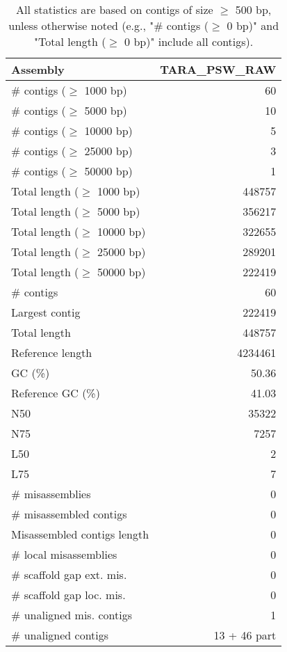 \documentclass[12pt,a4paper]{article}
\begin{document}
\begin{table}[ht]
\begin{center}
\caption{All statistics are based on contigs of size $\geq$ 500 bp, unless otherwise noted (e.g., "\# contigs ($\geq$ 0 bp)" and "Total length ($\geq$ 0 bp)" include all contigs).}
\begin{tabular}{|l*{1}{|r}|}
\hline
Assembly & TARA\_PSW\_RAW \\ \hline
\# contigs ($\geq$ 1000 bp) & 60 \\ \hline
\# contigs ($\geq$ 5000 bp) & 10 \\ \hline
\# contigs ($\geq$ 10000 bp) & 5 \\ \hline
\# contigs ($\geq$ 25000 bp) & 3 \\ \hline
\# contigs ($\geq$ 50000 bp) & 1 \\ \hline
Total length ($\geq$ 1000 bp) & 448757 \\ \hline
Total length ($\geq$ 5000 bp) & 356217 \\ \hline
Total length ($\geq$ 10000 bp) & 322655 \\ \hline
Total length ($\geq$ 25000 bp) & 289201 \\ \hline
Total length ($\geq$ 50000 bp) & 222419 \\ \hline
\# contigs & 60 \\ \hline
Largest contig & 222419 \\ \hline
Total length & 448757 \\ \hline
Reference length & 4234461 \\ \hline
GC (\%) & 50.36 \\ \hline
Reference GC (\%) & 41.03 \\ \hline
N50 & 35322 \\ \hline
N75 & 7257 \\ \hline
L50 & 2 \\ \hline
L75 & 7 \\ \hline
\# misassemblies & 0 \\ \hline
\# misassembled contigs & 0 \\ \hline
Misassembled contigs length & 0 \\ \hline
\# local misassemblies & 0 \\ \hline
\# scaffold gap ext. mis. & 0 \\ \hline
\# scaffold gap loc. mis. & 0 \\ \hline
\# unaligned mis. contigs & 1 \\ \hline
\# unaligned contigs & 13 + 46 part \\ \hline

\end{tabular}
\end{center}
\end{table}
\end{document}
